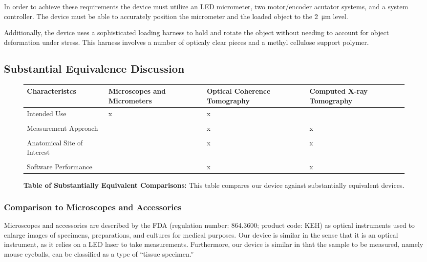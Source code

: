 \documentclass{article}
\begin{document}
In order to achieve these requirements the device must utilize an LED
micrometer, two motor/encoder acutator systems, and a system
controller. The device must be able to accurately position the
micrometer and the loaded object to the \SI{2}{\micro m} level.

Additionally, the device uses a sophisticated loading harness to hold
and rotate the object without needing to account for object
deformation under stress. This harness involves a number of opticaly
clear pieces and a methyl cellulose support polymer.
\subsection{Substantial Equivalence Discussion}

\begin{figure}[H]
  \begin{tabularx}{\textwidth}{YYYY}
    \toprule
    Characteristcs & \mbox{Microscopes} and \mbox{Micrometers} & Optical Coherence \mbox{Tomography} & Computed X-ray \mbox{Tomography} \\ 
    \hline
    Intended Use & x & x &  \\
    \\
    Measurement Approach &   & x & x \\ 
    \\
    Anatomical Site of Interest & & x & x \\
    \\
    Software Performance & & x & x\\
    \bottomrule
  \end{tabularx}
  \caption{\textbf{Table of Substantially Equivalent Comparisons:}
    This table compares our device against substantially equivalent
    devices.}
\end{figure}

\subsubsection{Comparison to Microscopes and Accessories}
Microscopes and accessories are described by the FDA (regulation
number: 864.3600; product code: KEH) as optical instruments used to
enlarge images of specimens, preparations, and cultures for medical
purposes. Our device is similar in the sense that it is an optical
instrument, as it relies on a LED laser to take
measurements. Furthermore, our device is similar in that the sample to
be measured, namely mouse eyeballs, can be classified as a type of
``tissue specimen.''
\end{document}

